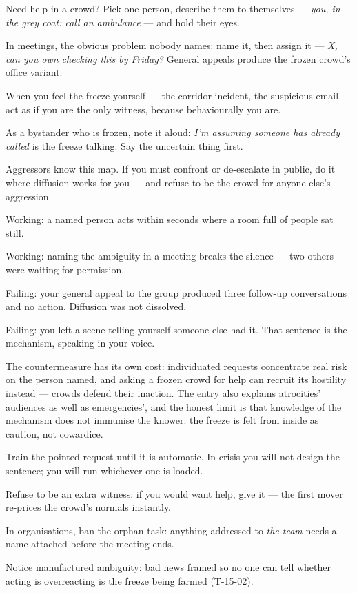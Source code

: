 \begin{application}
  \item Need help in a crowd? Pick one person, describe them to themselves --- \emph{you, in the grey coat: call an ambulance} --- and hold their eyes.
  \item In meetings, the obvious problem nobody names: name it, then assign it --- \emph{X, can you own checking this by Friday?} General appeals produce the frozen crowd's office variant.
  \item When you feel the freeze yourself --- the corridor incident, the suspicious email --- act as if you are the only witness, because behaviourally you are.
  \item As a bystander who is frozen, note it aloud: \emph{I'm assuming someone has already called} is the freeze talking. Say the uncertain thing first.
  \item Aggressors know this map. If you must confront or de-escalate in public, do it where diffusion works for you --- and refuse to be the crowd for anyone else's aggression.
\end{application}
\begin{feedback}
  \item Working: a named person acts within seconds where a room full of people sat still.
  \item Working: naming the ambiguity in a meeting breaks the silence --- two others were waiting for permission.
  \item Failing: your general appeal to the group produced three follow-up conversations and no action. Diffusion was not dissolved.
  \item Failing: you left a scene telling yourself someone else had it. That sentence is the mechanism, speaking in your voice.
\end{feedback}
\begin{failure}
The countermeasure has its own cost: individuated requests concentrate real risk on the person named, and asking a frozen crowd for help can recruit its hostility instead --- crowds defend their inaction. The entry also explains atrocities' audiences as well as emergencies', and the honest limit is that knowledge of the mechanism does not immunise the knower: the freeze is felt from inside as caution, not cowardice.
\end{failure}
\begin{countermeasures}
  \item Train the pointed request until it is automatic. In crisis you will not design the sentence; you will run whichever one is loaded.
  \item Refuse to be an extra witness: if you would want help, give it --- the first mover re-prices the crowd's normals instantly.
  \item In organisations, ban the orphan task: anything addressed to \emph{the team} needs a name attached before the meeting ends.
  \item Notice manufactured ambiguity: bad news framed so no one can tell whether acting is overreacting is the freeze being farmed (T-15-02).
\end{countermeasures}

\seesources
{}
